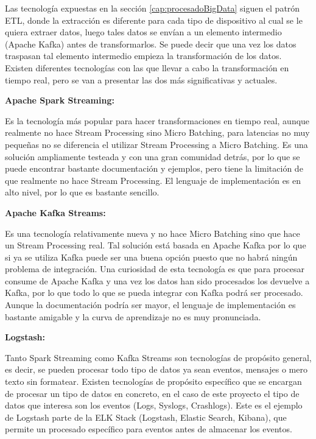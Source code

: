 Las tecnología expuestas en la sección \ref{cap:procesadoBigData} siguen el patrón ETL, donde la extracción es diferente para cada tipo de dispositivo al cual se le quiera extraer datos, luego tales datos se envían a un elemento intermedio (Apache Kafka) antes de transformarlos. Se puede decir que una vez los datos traspasan tal elemento intermedio empieza la transformación de los datos. Existen diferentes tecnologías con las que llevar a cabo la transformación en tiempo real, pero se van a presentar las dos más significativas y actuales.


\textbf{Apache Spark Streaming:}

Es la tecnología más popular para hacer transformaciones en tiempo real, aunque realmente no hace Stream Processing sino Micro Batching\cite{Tfg:microbatching}, para latencias no muy pequeñas no se diferencia el utilizar Stream Processing a Micro Batching. Es una solución ampliamente testeada y con una gran comunidad detrás, por lo que se puede encontrar bastante documentación y ejemplos, pero tiene la limitación de que realmente no hace Stream Processing. El lenguaje de implementación es en alto nivel, por lo que es bastante sencillo.

\textbf{Apache Kafka Streams:}

Es una tecnología relativamente nueva y no hace Micro Batching sino que hace un Stream Processing real. Tal solución está basada en Apache Kafka por lo que si ya se utiliza Kafka puede ser una buena opción puesto que no habrá ningún problema de integración. Una curiosidad de esta tecnología es que para procesar consume de Apache Kafka y una vez los datos han sido procesados los devuelve a Kafka, por lo que todo lo que se pueda integrar con Kafka podrá ser procesado. Aunque la documentación podría ser mayor, el lenguaje de implementación es bastante amigable y la curva de aprendizaje no es muy pronunciada.

\textbf{Logstash:}

Tanto Spark Streaming como Kafka Streams son tecnologías de propósito general, es decir, se pueden procesar todo tipo de datos ya sean eventos, mensajes o mero texto sin formatear. Existen tecnologías de propósito específico que se encargan de procesar un tipo de datos en concreto, en el caso de este proyecto el tipo de datos que interesa son los eventos (Logs, Syslogs, Crashlogs). Este es el ejemplo de Logstash parte de la ELK Stack (Logstash, Elastic Search, Kibana), que permite un procesado específico para eventos antes de almacenar los eventos.



